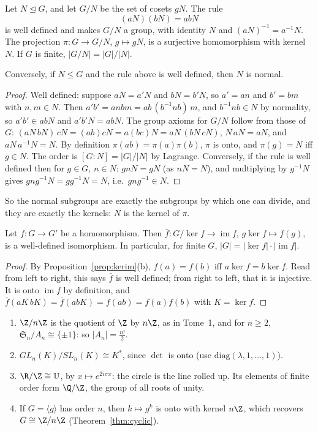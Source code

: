 \begin{theorem}\label{thm:quotient}
Let $N\trianglelefteq G$, and let $G/N$ be the set of cosets $gN$. The rule
\[
(aN)(bN)=abN
\]
is well defined and makes $G/N$ a group, with identity $N$ and $(aN)^{-1}=a^{-1}N$. The projection $\pi:G\to G/N$, $g\mapsto gN$, is a surjective homomorphism with kernel $N$. If $G$ is finite, $|G/N|=|G|/|N|$.

Conversely, if $N\le G$ and the rule above is well defined, then $N$ is normal.
\end{theorem}
\begin{proof}
Well defined: suppose $aN=a'N$ and $bN=b'N$, so $a'=an$ and $b'=bm$ with $n,m\in N$. Then $a'b'=anbm=ab\,(b^{-1}nb)\,m$, and $b^{-1}nb\in N$ by normality, so $a'b'\in abN$ and $a'b'N=abN$. The group axioms for $G/N$ follow from those of $G$: $(aN\,bN)\,cN=(ab)cN=a(bc)N=aN\,(bN\,cN)$, $N\,aN=aN$, and $aN\,a^{-1}N=N$. By definition $\pi(ab)=\pi(a)\pi(b)$, $\pi$ is onto, and $\pi(g)=N$ iff $g\in N$. The order is $[G:N]=|G|/|N|$ by Lagrange.
Conversely, if the rule is well defined then for $g\in G$, $n\in N$: $gnN=gN$ (as $nN=N$), and multiplying by $g^{-1}N$ gives $gng^{-1}N=gg^{-1}N=N$, i.e.\ $gng^{-1}\in N$.
\end{proof}

So the normal subgroups are exactly the subgroups by which one can divide, and they are exactly the kernels: $N$ is the kernel of $\pi$.

\begin{theorem}\label{thm:iso1}
Let $f:G\to G'$ be a homomorphism. Then $\bar f:G/\ker f\to\operatorname{im}f$, $g\ker f\mapsto f(g)$, is a well-defined isomorphism. In particular, for finite $G$, $|G|=|\ker f|\cdot|\operatorname{im}f|$.
\end{theorem}
\begin{proof}
By Proposition~\ref{prop:kerim}(b), $f(a)=f(b)$ iff $a\ker f=b\ker f$. Read from left to right, this says $\bar f$ is well defined; from right to left, that it is injective. It is onto $\operatorname{im}f$ by definition, and $\bar f(aK\,bK)=\bar f(abK)=f(ab)=f(a)f(b)$ with $K=\ker f$.
\end{proof}

\begin{example}\label{ex:iso1}
\begin{enumerate}[label=(\arabic*)]
\item $\Z/n\Z$ is the quotient of $\Z$ by $n\Z$, as in Tome~1, and for $n\ge2$, $\mathfrak S_n/A_n\cong\{\pm1\}$: so $|A_n|=\frac{n!}2$.
\item $GL_n(K)/SL_n(K)\cong K^*$, since $\det$ is onto (use $\mathrm{diag}(\lambda,1,\dots,1)$).
\item $\R/\Z\cong\mathbb U$, by $x\mapsto e^{2i\pi x}$: the circle is the line rolled up. Its elements of finite order form $\Q/\Z$, the group of all roots of unity.
\item If $G=\langle g\rangle$ has order $n$, then $k\mapsto g^k$ is onto with kernel $n\Z$, which recovers $G\cong\Z/n\Z$ (Theorem~\ref{thm:cyclic}).
\end{enumerate}
\end{example}

